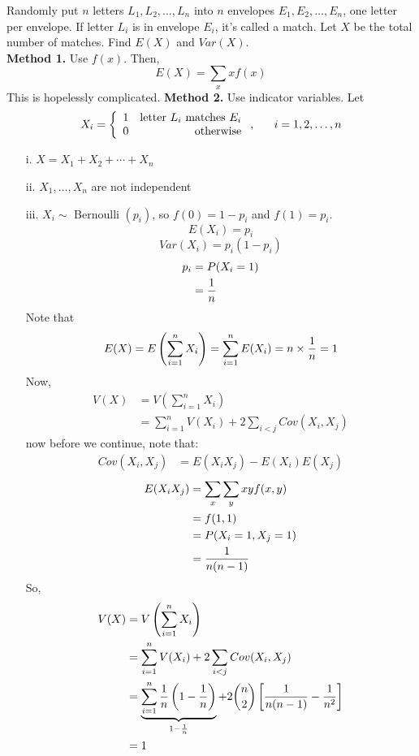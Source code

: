 \documentclass[english, 11pt]{article}
\begin{document}
  \begin{exmp}
    Randomly put $n$ letters $L_1, L_2, \ldots, L_n$ into $n$ envelopes $E_1, E_2, \ldots, E_n$, one letter per envelope. If letter $L_i$ is in envelope $E_i$, it's called a match. Let $X$ be the total number of matches. Find $E(X)$ and $Var(X)$. \\

    \textbf{Method 1.} Use $f(x)$. Then,
    \[ E(X) = \sum_x xf(x) \]
    This is hopelessly complicated.
    \textbf{Method 2.} Use indicator variables. Let
    \[ X_i = \left\{ \begin{array}{lr} 1 & \mbox{letter $L_i$ matches $E_i$} \\ 0 & \mbox{otherwise} \end{array} \right. , \ \ \ \ \ i = 1,2,\ldots,n\]
    \begin{itemize}
      \item[i.]  $X = X_1 + X_2 + \cdots + X_n$
      \item[ii.] $X_1, \ldots, X_n$ are not independent
      \item[iii.] $X_i \sim$ Bernoulli $(p_i)$, so $f(0) = 1-p_i$ and $f(1) = p_i$.
      \[ E(X_i) = p_i \]
      \[ Var(X_i) = p_i(1-p_i) \]
      \begin{align*}
        p_i & = P(X_i = 1) \\
            & = \frac{1}{n}
      \end{align*}
      Note that
      \[ E(X) = E \left( \sum_{i = 1}^n X_i \right) = \sum_{i = 1}^nE(X_i) = n \times \frac{1}{n} = 1\]
      Now,
      \begin{align*}
        V(X) & = V \left( \sum_{i = 1}^n X_i \right) \\
             & = \sum_{i = 1}^n V(X_i) + 2\sum_{i < j} Cov(X_i, X_j)
      \end{align*}
      now before we continue, note that:
      \begin{align*}
        Cov(X_i, X_j) & = E(X_iX_j) - E(X_i)E(X_j)
      \end{align*}
      \begin{align*}
        E(X_iX_j) & = \sum_x \sum_y xyf(x,y) \\
        &  = f(1,1) \\
        & = P(X_i = 1, X_j = 1) \\
        & = \frac{1}{n(n-1)}
      \end{align*}
      So,
          \begin{align*}
        V(X) & = V \left( \sum_{i = 1}^n X_i \right) \\
             & = \sum_{i = 1}^n V(X_i) + 2\sum_{i < j} Cov(X_i, X_j) \\
             & = \underbrace{\sum_{i = 1}^n \frac{1}{n} \left( 1 - \frac{1}{n} \right)}_{1 - \frac{1}{n}} + 2{n \choose 2} \left[ \frac{1}{n(n-1)} - \frac{1}{n^2} \right] \\
             & = 1
      \end{align*}
    \end{itemize}
  \end{exmp}
\end{document}
